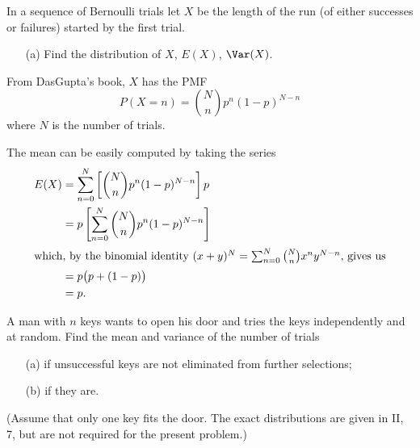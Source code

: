 \begin{problem}[Handout 7, \# 16]
  In a sequence of Bernoulli trials let \(X\) be the length of the run (of
  either successes or failures) started by the first trial.
  \begin{itemize}[noitemsep]
  \item[(a)] Find the distribution of \(X\), \(E(X)\), \(\Var(X)\).
  \end{itemize}
\end{problem}
\begin{solution}
  From DasGupta's book, \(X\) has the PMF
  \[
    P(X=n)=\binom{N}{n}p^n(1-p)^{N-n}
  \]
  where \(N\) is the number of trials.

  The mean can be easily computed by taking the series
  \begin{align*}
    E(X)&=\sum_{n=0}^N\left[\binom{N}{n}p^n(1-p)^{N-n}\right]p\\
        &=p\left[\sum_{n=0}^N\binom{N}{n}p^n(1-p)^{N-n}\right]\\
    \intertext{which, by the binomial identity
    \((x+y)^N=\sum_{n=0}^N\binom{N}{n}x^ny^{N-n}\), gives us}
        &=p\bigl(p+(1-p)\bigr)\\
        &=p.
  \end{align*}
\end{solution}
\newpage

\begin{problem}[Handout 7, \# 17]
  A man with \(n\) keys wants to open his door and tries the keys
  independently and at random. Find the mean and variance of the number of
  trials
  \begin{itemize}[noitemsep]
  \item[(a)] if unsuccessful keys are not eliminated from further
    selections;
  \item[(b)] if they are.
  \end{itemize}
  (Assume that only one key fits the door. The exact distributions are
  given in II, 7, but are not required for the present problem.)
\end{problem}
\begin{solution}

\end{solution}

